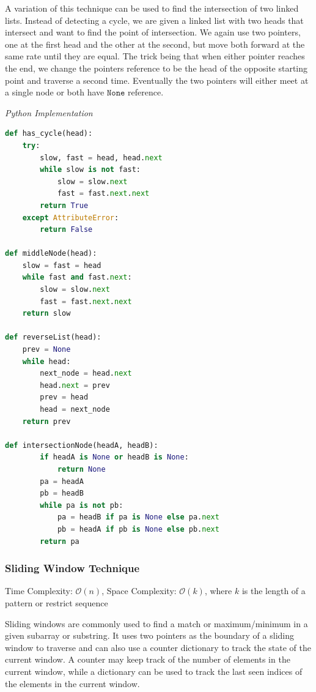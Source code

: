 \documentclass{article}
\newcommand{\bigO}{\mathcal{O}}
\begin{document}
    A variation of this technique can be used to find the intersection of two linked lists. Instead of detecting a cycle, we are given a linked list with two heads that intersect and want to find the point of intersection. We again use two pointers, one at the first head and the other at the second, but move both forward at the same rate until they are equal. The trick being that when either pointer reaches the end, we change the pointers reference to be the head of the opposite starting point and traverse a second time. Eventually the two pointers will either meet at a single node or both have $\mathtt{None}$ reference.  

\vspace{8pt} \emph{Python Implementation}
\begin{lstlisting}[language=Python]
def has_cycle(head):
    try:
        slow, fast = head, head.next
        while slow is not fast:
            slow = slow.next
            fast = fast.next.next
        return True
    except AttributeError:
        return False
        
def middleNode(head):
    slow = fast = head
    while fast and fast.next:
        slow = slow.next
        fast = fast.next.next
    return slow

def reverseList(head):
    prev = None
    while head:
        next_node = head.next
        head.next = prev
        prev = head
        head = next_node
    return prev
    
def intersectionNode(headA, headB):
        if headA is None or headB is None:
            return None
        pa = headA 
        pb = headB
        while pa is not pb:
            pa = headB if pa is None else pa.next
            pb = headA if pb is None else pb.next
        return pa
\end{lstlisting}


    \subsubsection{Sliding Window Technique}
    Time Complexity: $\bigO(n)$, Space Complexity: $\bigO(k)$, where $k$ is the length of a pattern or restrict sequence 
    
    Sliding windows are commonly used to find a match or maximum/minimum in a given subarray or substring. It uses two pointers as the boundary of a sliding window to traverse and can also use a counter dictionary to track the state of the current window. A counter may keep track of the number of elements in the current window, while a dictionary can be used to track the last seen indices of the elements in the current window.
    
\end{document}
